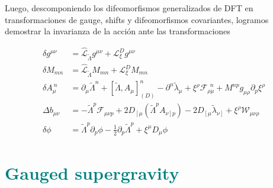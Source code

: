 \documentclass{article}
\numberwithin{equation}{section}
\begin{document}
\begin{boxumen}
	Luego, descomponiendo los difeomorfismos generalizados de DFT en transformaciones de gauge, shifts y difeomorfismos covariantes, logramos demostrar la invarianza de la acción ante las transformaciones
	
	\begin{equation}\label{DFTKKtransformation}
	\begin{aligned}
	\delta g^{\mu \nu} &= \hat{\mathcal{L}}_{\widetilde{\Lambda}} g^{\mu \nu} + \mathcal{L}_{\xi}^{D}  g^{\mu \nu}\\
	\delta M_{m n}&= \hat{\mathcal{L}}_{\widetilde{\Lambda}} M_{m n} + \mathcal{L}_{\xi}^D M_{m n}\\
	\delta A_{\mu}^{\ n} &=\partial_{\mu} \widetilde{\Lambda}^n + \left[ \widetilde{\Lambda}, A_{\mu}\right]_{(D)}^n - \partial^n \widetilde{\lambda}_{\mu} + \xi^{\rho} \mathcal{F}_{\rho \mu}^{\ \ n} + M^{n p} g_{\mu \rho} \partial_p \xi^{\rho}\\
	\Delta b_{\mu \nu} &= -\widetilde{\Lambda}^p \mathcal{F}_{\mu \nu p} + 2 D_{\left[ \mu \right.} \left( \widetilde{\Lambda}^p A_{\left.\nu\right] p} \right) - 2 D_{\left[\mu \right.} \widetilde{\lambda}_{\left.\nu \right]} + \xi^{\rho} \mathcal{W}_{\mu \nu \rho}\\
	\delta \phi &= \widetilde{\Lambda}^p \partial_p \phi - \frac{1}{2} \partial_p \widetilde{\Lambda}^p + \xi^{\mu} D_{\mu} \phi 
	\end{aligned}
	\end{equation}
	
	
\end{boxumen}


\section{\textcolor{teal}{Gauged supergravity}}
\end{document}
